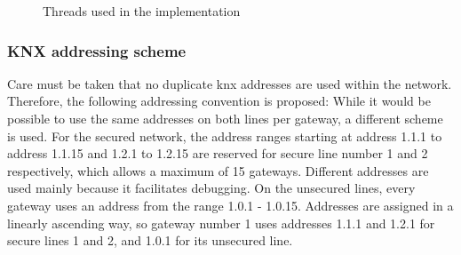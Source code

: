 \begin{figure}
\centering
{}
\label{fig:threads}
\caption{Threads used in the implementation}
\end{figure}


\subsubsection{KNX addressing scheme}

Care must be taken that no duplicate \gls{knx} addresses are used within the network. Therefore, the following addressing convention is proposed:
While it would be possible to use the same addresses on both lines per gateway, a different scheme is used.
For the secured network, the address ranges starting at address 1.1.1 to address 1.1.15 and 1.2.1 to 1.2.15 are reserved for secure line number
1 and 2 respectively, which allows a maximum of 15 gateways. Different addresses are used mainly because it facilitates debugging. 
On the unsecured lines, every gateway uses an address from the range 1.0.1 - 1.0.15. Addresses are assigned in a linearly ascending way, so gateway number 1
uses addresses 1.1.1 and 1.2.1 for secure lines 1 and 2, and 1.0.1 for its unsecured line.

